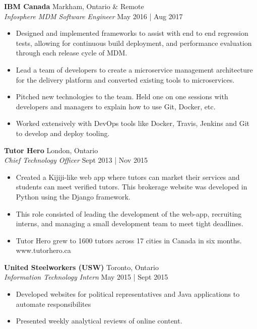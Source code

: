\documentclass[a4paper]{article}
\begin{document}
\textbf{IBM Canada} \hfill Markham, Ontario \& Remote\\
\textit{Infosphere MDM Software Engineer} \hfill May 2016 | Aug 2017\\
\vspace{-1mm}
\begin{itemize} \itemsep 1pt
	\item Designed and implemented frameworks to assist with end to end regression tests, allowing for continuous build deployment, and performance evaluation through each release cycle of MDM.
	\item Lead a team of developers to create a microservice management architecture for the delivery platform and converted existing tools to microservices.
	\item Pitched new technologies to the team. Held one on one sessions with developers and managers to explain how to use Git, Docker, etc.
	\item Worked extensively with DevOps tools like Docker, Travis, Jenkins and Git to develop and deploy tooling.
\end{itemize}

\textbf{Tutor Hero} \hfill London, Ontario\\
\textit{Chief Technology Officer} \hfill Sept 2013 | Nov 2015\\
\vspace{-1mm}
\begin{itemize} \itemsep 1pt
	\item Created a Kijiji-like web app where tutors can market their services and students can meet verified tutors. This brokerage website was developed in Python using the Django framework.  
	\item This role consisted of leading the development of the web-app, recruiting interns, and managing a small development team to meet tight deadlines. 
	\item Tutor Hero grew to 1600 tutors across 17 cities in Canada in six months. www.tutorhero.ca
\end{itemize}

\textbf{United Steelworkers (USW)} \hfill Toronto, Ontario\\
\textit{Information Technology Intern} \hfill May 2015 | Sept 2015\\
\vspace{-1mm}
\begin{itemize} \itemsep 1pt
	\item Developed websites for political representatives and Java applications to automate responsibilites
	\item Presented weekly analytical reviews of online content.
\end{itemize}
\end{document}
